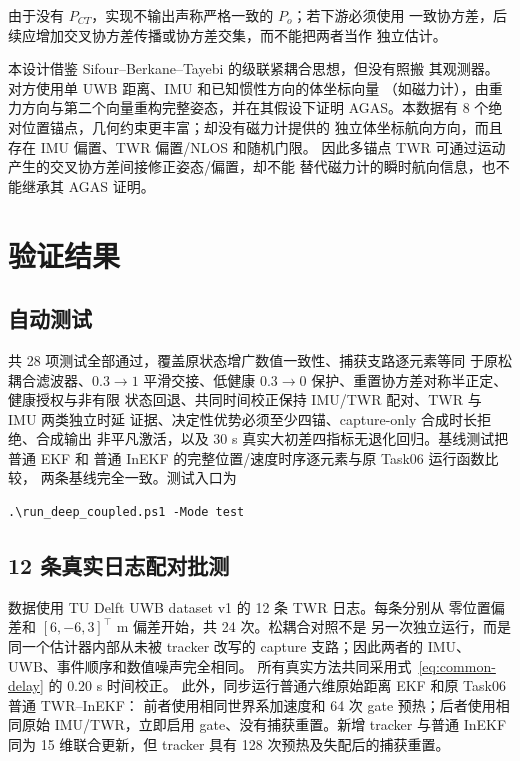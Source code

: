 \documentclass[11pt,a4paper]{ctexart}
\begin{document}
由于没有 $P_{CT}$，实现不输出声称严格一致的 $P_o$；若下游必须使用
一致协方差，后续应增加交叉协方差传播或协方差交集，而不能把两者当作
独立估计。

本设计借鉴 Sifour--Berkane--Tayebi 的级联紧耦合思想，但没有照搬
其观测器。对方使用单 UWB 距离、IMU 和已知惯性方向的体坐标向量
（如磁力计），由重力方向与第二个向量重构完整姿态，并在其假设下证明
AGAS。本数据有 8 个绝对位置锚点，几何约束更丰富；却没有磁力计提供的
独立体坐标航向方向，而且存在 IMU 偏置、TWR 偏置/NLOS 和随机门限。
因此多锚点 TWR 可通过运动产生的交叉协方差间接修正姿态/偏置，却不能
替代磁力计的瞬时航向信息，也不能继承其 AGAS 证明。

\section{验证结果}

\subsection{自动测试}

共 28 项测试全部通过，覆盖原状态增广数值一致性、捕获支路逐元素等同
于原松耦合滤波器、$0.3\rightarrow1$ 平滑交接、低健康
$0.3\rightarrow0$ 保护、重置协方差对称半正定、健康授权与非有限
状态回退、共同时间校正保持 IMU/TWR 配对、TWR 与 IMU 两类独立时延
证据、决定性优势必须至少四锚、capture-only 合成时长拒绝、合成输出
非平凡激活，以及 30 s 真实大初差四指标无退化回归。基线测试把普通 EKF 和
普通 InEKF 的完整位置/速度时序逐元素与原 Task06 运行函数比较，
两条基线完全一致。测试入口为
\begin{verbatim}
.\run_deep_coupled.ps1 -Mode test
\end{verbatim}

\subsection{12 条真实日志配对批测}

数据使用 TU Delft UWB dataset v1 的 12 条 TWR 日志。每条分别从
零位置偏差和 $[6,-6,3]^\top$ m 偏差开始，共 24 次。松耦合对照不是
另一次独立运行，而是同一个估计器内部从未被 tracker 改写的 capture
支路；因此两者的 IMU、UWB、事件顺序和数值噪声完全相同。
所有真实方法共同采用式~\eqref{eq:common-delay} 的 $0.20$ s 时间校正。
此外，同步运行普通六维原始距离 EKF 和原 Task06 普通 TWR--InEKF：
前者使用相同世界系加速度和 64 次 gate 预热；后者使用相同原始
IMU/TWR，立即启用 gate、没有捕获重置。新增 tracker 与普通 InEKF
同为 15 维联合更新，但 tracker 具有 128 次预热及失配后的捕获重置。
\end{document}
